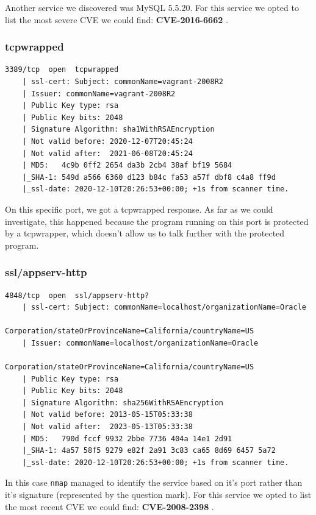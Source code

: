 Another service we discovered was MySQL 5.5.20. For this service we opted to list the most severe CVE we could find: \textbf{CVE-2016-6662} \cite{cve5}.

\pagebreak

\subsubsection{tcpwrapped}

\begin{lstlisting}[basicstyle=\scriptsize]
    3389/tcp  open  tcpwrapped
    | ssl-cert: Subject: commonName=vagrant-2008R2
    | Issuer: commonName=vagrant-2008R2
    | Public Key type: rsa
    | Public Key bits: 2048
    | Signature Algorithm: sha1WithRSAEncryption
    | Not valid before: 2020-12-07T20:45:24
    | Not valid after:  2021-06-08T20:45:24
    | MD5:   4c9b 0ff2 2654 da3b 2cb4 38af bf19 5684
    |_SHA-1: 549d a566 6360 d123 b84c fa53 a57f dbf8 c4a8 ff9d
    |_ssl-date: 2020-12-10T20:26:53+00:00; +1s from scanner time.
\end{lstlisting}

On this specific port, we got a tcpwrapped response. As far as we could investigate, this happened because the program running on this port is protected by a tcpwrapper, which doesn't allow us to talk further with the protected program.


\subsubsection{ssl/appserv-http}

\begin{lstlisting}[basicstyle=\scriptsize]
    4848/tcp  open  ssl/appserv-http?
    | ssl-cert: Subject: commonName=localhost/organizationName=Oracle 
                 Corporation/stateOrProvinceName=California/countryName=US
    | Issuer: commonName=localhost/organizationName=Oracle 
                 Corporation/stateOrProvinceName=California/countryName=US
    | Public Key type: rsa
    | Public Key bits: 2048
    | Signature Algorithm: sha256WithRSAEncryption
    | Not valid before: 2013-05-15T05:33:38
    | Not valid after:  2023-05-13T05:33:38
    | MD5:   790d fccf 9932 2bbe 7736 404a 14e1 2d91
    |_SHA-1: 4a57 58f5 9279 e82f 2a91 3c83 ca65 8d69 6457 5a72
    |_ssl-date: 2020-12-10T20:26:53+00:00; +1s from scanner time.
\end{lstlisting}

In this case \texttt{nmap} managed to identify the service based on it's port rather than it's signature (represented by the question mark). For this service we opted to list the most recent CVE we could find: \textbf{CVE-2008-2398} \cite{cve7}.

